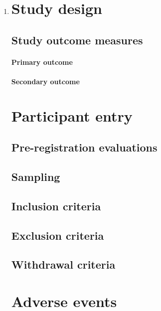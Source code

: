 \documentclass[a4paper,10pt]{article}
\begin{document}
\begin{enumerate}
    \item 

\section{Study design}
\subsection{Study outcome measures}
\paragraph{Primary outcome}


\paragraph{Secondary outcome}


\section{Participant entry}
\subsection{Pre-registration evaluations}


\subsection{Sampling}


\subsection{Inclusion criteria}



\subsection{Exclusion criteria}


\subsection{Withdrawal criteria} 


\section{Adverse events}


\end{enumerate}
\end{document}
